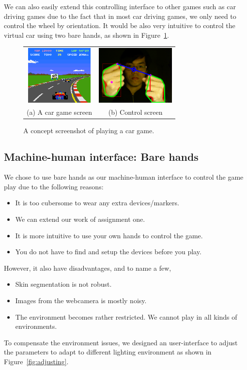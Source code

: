 \documentclass[10pt,twocolumn,letterpaper]{article}
\begin{document}
We can also easily extend this controlling interface to other 
games such as car driving games due to the fact that in most 
car driving games, we only need to control the wheel by 
orientation. It would be also very intuitive to control 
the virtual car using two bare hands, as shown in Figure~\ref{fig:cargame}.
\begin{figure}[h]
\centering
\begin{tabular}{cc}
\includegraphics[height=3cm]{cargame.png} &
\includegraphics[height=3cm]{gesture0047.png} \\
(a) A car game screen &
(b) Control screen
\end{tabular}
\caption{A concept screenshot of playing a car game.}
\label{fig:cargame}
\end{figure}

\subsection{Machine-human interface: Bare hands}
We chose to use bare hands as our machine-human interface 
to control the game play due to the following reasons:

\begin{itemize}
	\item It is too cubersome to wear any extra devices/markers.
	\item We can extend our work of assignment one.
	\item It is more intuitive to use your own hands to control the game.
	\item You do not have to find and setup the devices before you play.
\end{itemize}

However, it also have disadvantages, and to name a few,
\begin{itemize}
	\item Skin segmentation is not robust.
	\item Images from the webcamera is mostly noisy.
	\item The environment becomes rather restricted. We cannot play in all kinds of environments.
\end{itemize}
To compensate the environment issues, we designed an user-interface 
to adjust the parameters to adapt to different lighting environment as shown in Figure~\ref{fig:adjusting}. 
\end{document}
